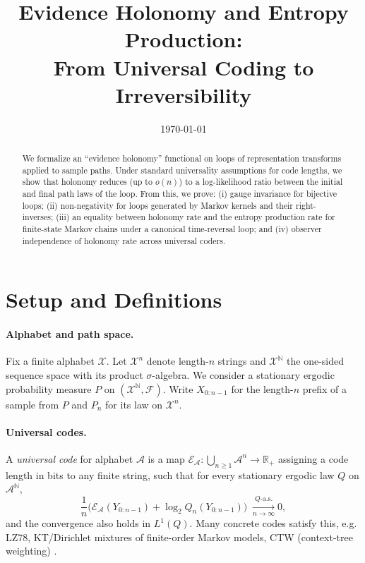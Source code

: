 \documentclass[11pt]{article}
\title{Evidence Holonomy and Entropy Production:\\
From Universal Coding to Irreversibility}
\author{}
\date{\today}
\newcommand{\X}{\mathcal{X}}
\newcommand{\N}{\mathbb{N}}
\newcommand{\1}{\mathbbm{1}}
\newcommand{\code}{\mathcal{E}}
\newcommand{\RR}{\mathbb{R}}
\begin{document}
\maketitle

\begin{abstract}
We formalize an ``evidence holonomy'' functional on loops of representation transforms applied to sample paths.
Under standard universality assumptions for code lengths, we show that holonomy reduces (up to $o(n)$) to a log-likelihood ratio between the initial and final path laws of the loop.
From this, we prove: (i) gauge invariance for bijective loops; (ii) non-negativity for loops generated by Markov kernels and their right-inverses; (iii) an equality between holonomy rate and the entropy production rate for finite-state Markov chains under a canonical time-reversal loop; and (iv) observer independence of holonomy rate across universal coders.
\end{abstract}

\section{Setup and Definitions}

\paragraph{Alphabet and path space.} Fix a finite alphabet $\X$. Let $\X^n$ denote length-$n$ strings and $\X^{\N}$ the one-sided sequence space with its product $\sigma$-algebra.
We consider a stationary ergodic probability measure $P$ on $(\X^{\N},\mathcal{F})$.
Write $X_{0:n-1}$ for the length-$n$ prefix of a sample from $P$ and $P_n$ for its law on $\X^n$.

\paragraph{Universal codes.}
A \emph{universal code} for alphabet $\mathcal{A}$ is a map $\code_{\mathcal{A}}:\bigcup_{n\ge 1}\mathcal{A}^n\to \RR_+$ assigning a code length in bits to any finite string, such that for every stationary ergodic law $Q$ on $\mathcal{A}^{\N}$,
\begin{equation}\label{eq:universality}
\frac{1}{n}\Big(\code_{\mathcal{A}}(Y_{0:n-1}) + \log_2 Q_n(Y_{0:n-1})\Big) \;\xrightarrow[n\to\infty]{Q\text{-a.s.}} 0,
\end{equation}
and the convergence also holds in $L^1(Q)$. Many concrete codes satisfy this, e.g. LZ78, KT/Dirichlet mixtures of finite-order Markov models, CTW (context-tree weighting) \cite{ziv1978, rissanen1978mdl, barron1985, willems1995ctw, shields1996}.
\end{document}
